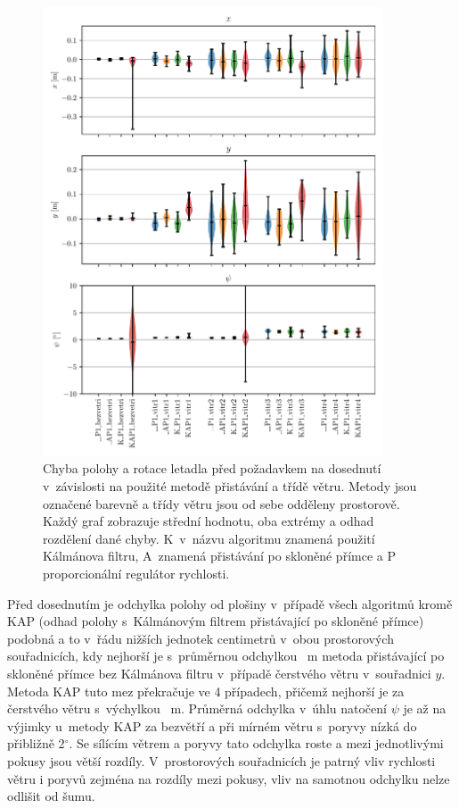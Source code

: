    \begin{figure}[H]
      \centering
      \includegraphics[width=0.9\textwidth]{img/results/presnostDotyku.pdf}
      \caption[Chyba před dosednutím]{Chyba polohy a rotace letadla před požadavkem na dosednutí v~závislosti na použité metodě přistávání a třídě větru. Metody jsou označené barevně a třídy větru jsou od sebe odděleny prostorově. Každý graf zobrazuje střední hodnotu, oba extrémy a odhad rozdělení dané chyby. K~v~názvu algoritmu znamená použití Kálmánova filtru, A~znamená přistávání po skloněné přímce a P proporcionální regulátor rychlosti.}
      \label{fig:dosednutiViolin}
    \end{figure}

    Před dosednutím je odchylka polohy od plošiny v~případě všech algoritmů kromě KAP (odhad polohy s~Kálmánovým filtrem přistávající po skloněné přímce) podobná a to v~řádu nižších jednotek centimetrů v~obou prostorových souřadnicích, kdy nejhorší je s~průměrnou odchylkou \mistoPredPristaniYmeanLAPILvitrIII~m metoda přistávající po skloněné přímce bez Kálmánova filtru v~případě čerstvého větru v~souřadnici $y$. Metoda KAP tuto mez překračuje ve 4 případech, přičemž nejhorší je za čerstvého větru s~výchylkou \mistoPredPristaniYmeanKAPILvitrIII~m. Průměrná odchylka v~úhlu natočení $\psi$ je až na výjimky u~metody KAP za bezvětří a při mírném větru s~poryvy nízká do přibližně 2$^\circ$. Se sílícím větrem a poryvy tato odchylka roste a mezi jednotlivými pokusy jsou větší rozdíly. V~prostorových souřadnicích je patrný vliv rychlosti větru i poryvů zejména na rozdíly mezi pokusy, vliv na samotnou odchylku nelze odlišit od šumu.


